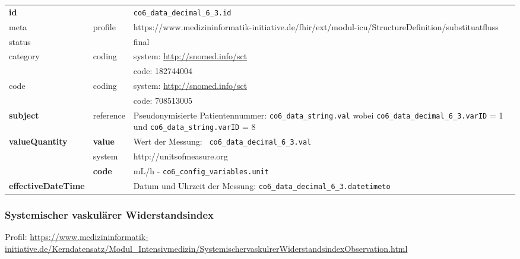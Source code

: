 \begin{longtable}{|l|l|p{7.5cm}|}
        \hline
        \rowcolor{lightgray} \multicolumn{3}{|l|}{Data Mapping (inhaltlich)} \\ \hline
        \textbf{id} &  & \texttt{co6\_data\_decimal\_6\_3.id} \\ \hline
	meta & profile & https://www.medizininformatik-initiative.de/fhir/ext/modul-icu/StructureDefinition/substituatfluss \\ \hline 
	status &  & final   \\ \hline 
	category & coding & system: \url{http://snomed.info/sct} \\
\cline{3-3}
	& & code: 182744004 \\ \hline
	code & coding & system: \url{http://snomed.info/sct} \\ 
	\cline{3-3} 
	&  & code: 708513005 \\ \hline
	 \textbf{subject} & reference & Pseudonymisierte Patientennummer: \texttt{co6\_data\_string.val} wobei \texttt{co6\_data\_decimal\_6\_3.varID} = 1 und \texttt{co6\_data\_string.varID} = 8 \\ \hline
	 \textbf{valueQuantity}  & \textbf{value} & Wert der Messung: \texttt{
co6\_data\_decimal\_6\_3.val} \\
        \cline{2-3}
         & system & http://unitsofmeasure.org \\
         \cline{2-3}
         & \textbf{code} & mL/h - \texttt{co6\_config\_variables.unit} \\ \hline
     \textbf{effectiveDateTime}  & & Datum und Uhrzeit der Messung: \texttt{co6\_data\_decimal\_6\_3.datetimeto} \\ \hline
\end{longtable}

\subsubsection{Systemischer vaskulärer Widerstandsindex} 
Profil: \url{https://www.medizininformatik-initiative.de/Kerndatensatz/Modul_Intensivmedizin/SystemischervaskulrerWiderstandsindexObservation.html}

